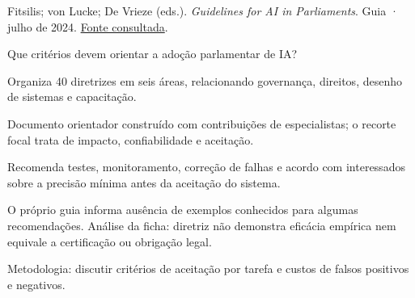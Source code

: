{\small Fitsilis; von Lucke; De Vrieze (eds.). \textit{Guidelines for AI in Parliaments}. Guia · julho de 2024. \href{https://www.agora-parl.org/sites/default/files/agora-documents/English%20-%20WFD%20AI%20Guidelines%20for%20Parliaments.pdf}{Fonte consultada}.\par}

Que critérios devem orientar a adoção parlamentar de IA?

Organiza 40 diretrizes em seis áreas, relacionando governança, direitos, desenho de sistemas e capacitação.

Documento orientador construído com contribuições de especialistas; o recorte focal trata de impacto, confiabilidade e aceitação.

Recomenda testes, monitoramento, correção de falhas e acordo com interessados sobre a precisão mínima antes da aceitação do sistema.

\begin{itemize}
\end{itemize}

O próprio guia informa ausência de exemplos conhecidos para algumas recomendações. Análise da ficha: diretriz não demonstra eficácia empírica nem equivale a certificação ou obrigação legal.

Metodologia: discutir critérios de aceitação por tarefa e custos de falsos positivos e negativos.

